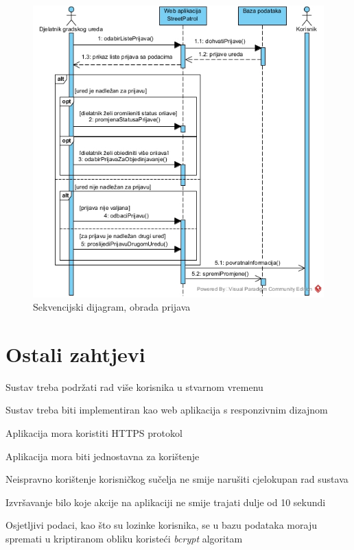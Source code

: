 				\begin{figure}[H]
					\includegraphics[width=\textwidth]{slike/Obrada_prijavaSD.jpg} %
					\caption{Sekvencijski dijagram, obrada prijava}
					\label{fig:sekvencijskiDijagram3} %
				\end{figure}
				\eject


	
		\section{Ostali zahtjevi}
			
			\begin{packed_item}
				\item Sustav treba podržati rad više korisnika u stvarnom vremenu
				\item Sustav treba biti implementiran kao web aplikacija s responzivnim dizajnom
				\item Aplikacija mora koristiti HTTPS protokol
				\item Aplikacija mora biti jednostavna za korištenje
				\item Neispravno korištenje korisničkog sučelja ne smije narušiti cjelokupan rad sustava
				\item Izvršavanje bilo koje akcije na aplikaciji ne smije trajati dulje od 10 sekundi
				\item Osjetljivi podaci, kao što su lozinke korisnika, se u bazu podataka moraju spremati u kriptiranom obliku koristeći \textit{bcrypt} algoritam
			\end{packed_item}
			